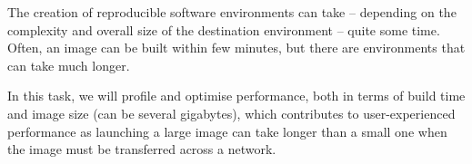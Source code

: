 \begin{task}[
  title=Performance optimisation,
  id=performance-optimisation,
  lead=QS,
  PM=9,
  partners={SRL}
]
  The creation of reproducible software environments can take -- depending on
  the complexity and overall size of the destination environment -- quite some time.
  Often, an image can be built within few minutes,
  but there are environments that can take much longer.

  In this task, we will profile and optimise \repotodocker{} performance,
  both in terms of build time
  and image size (can be several gigabytes),
  which contributes to user-experienced performance as launching a large image
  can take longer than a small one
  when the image must be transferred across a network.
\end{task}
